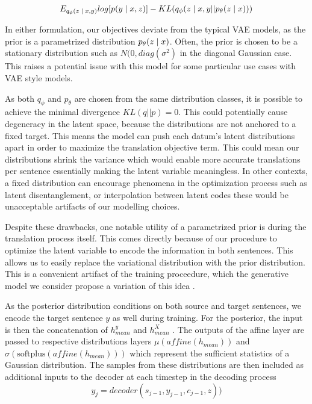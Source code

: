 \begin{equation}
E_{q_{\phi}(z \; | \;{x, y})}  log[p(y \; | \;{x, z} ) ] - KL (q_{\phi}(z \; | \;{x, y} || p_{\theta}(z \; | \;{x})))
\end{equation}

In either formulation, our objectives deviate from the typical VAE models, as the prior is a parametrized distribution $p_{\theta}(z \; | \;{x})$. Often, the prior is chosen to be a stationary distribution such as $N(0, diag(\sigma^{2})$ in the diagonal Gaussian case. This raises a potential issue with this model for some particular use cases with \ac{VAE} style models. 

As both $q_{\phi}$ and $p_{\theta}$ are chosen from the same distribution classes, it is possible to achieve the minimal divergence $KL(q || p) = 0$. This could potentially cause degeneracy in the latent space, because the distributions are not anchored to a fixed target. This means the model can push each datum's latent distributions apart in order to maximize the translation objective term. This could mean our distributions shrink the variance which would enable more accurate translations per sentence essentially making the latent variable meaningless. In other contexts, a fixed distribution can encourage phenomena in the optimization process such as latent disentanglement, or interpolation between latent codes these would be unacceptable artifacts of our modelling choices. 

Despite these drawbacks, one notable utility of a parametrized prior is during the translation process itself. This comes directly because of our procedure to optimize the latent variable to encode the information in both sentences. This allows us to easily replace the variational distribution with the prior distribution. This is a convenient artifact of the training proceedure, which the generative model we consider propose a variation of this idea \cite{eikema2018AEVNMT}.  %

As the  posterior distribution conditions on both source and target sentences, we encode the target sentence $y$ as well during training. For the posterior, the input is then the concatenation of $h_{mean}^y$ and $h_{mean}^X$ . The outputs of the affine layer are passed to respective distributions layers $\mu(affine(h_{mean}))$ and $\sigma(\text{softplus} (affine(h_{mean})))$ which represent the sufficient statistics of a Gaussian distribution. The samples from these distributions are then included as additional inputs to the decoder at each timestep in the decoding process
\begin{equation}
y_{j} = decoder(s_{j-1}, y_{j-1}, c_{j-1}, z))
\end{equation}



